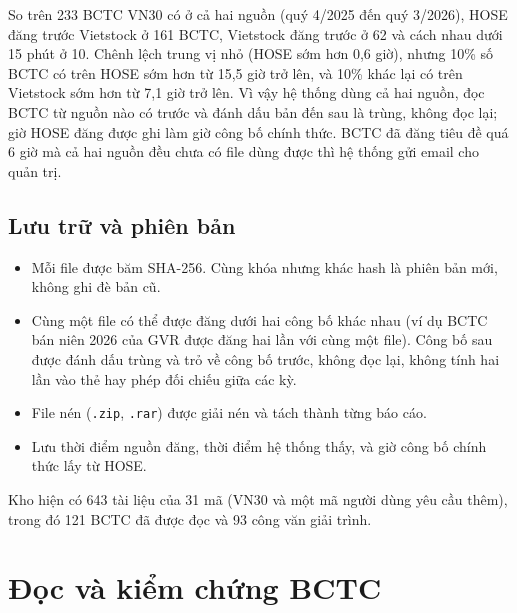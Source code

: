 \documentclass[12pt,a4paper]{report}
\newcommand{\code}[1]{\texttt{#1}}
\begin{document}
So trên 233 BCTC VN30 có ở cả hai nguồn (quý 4/2025 đến quý 3/2026), HOSE đăng trước Vietstock ở 161 BCTC, Vietstock
đăng trước ở 62 và cách nhau dưới 15 phút ở 10. Chênh lệch trung vị nhỏ (HOSE sớm hơn 0,6 giờ), nhưng 10\% số BCTC có
trên HOSE sớm hơn từ 15,5 giờ trở lên, và 10\% khác lại có trên Vietstock sớm hơn từ 7,1 giờ trở lên. Vì vậy hệ thống
dùng cả hai nguồn, đọc BCTC từ nguồn nào có trước và đánh dấu bản đến sau là trùng, không đọc lại; giờ HOSE đăng được
ghi làm giờ công bố chính thức. BCTC đã đăng tiêu đề quá 6 giờ mà cả hai nguồn đều chưa có file dùng được thì hệ thống
gửi email cho quản trị.

\subsection{Lưu trữ và phiên bản}
\begin{itemize}
  \item Mỗi file được băm SHA-256. Cùng khóa nhưng khác hash là phiên bản mới, không ghi đè bản cũ.
  \item Cùng một file có thể được đăng dưới hai công bố khác nhau (ví dụ BCTC bán niên 2026 của GVR được đăng hai lần
        với cùng một file). Công bố sau được đánh dấu trùng và trỏ về công bố trước, không đọc lại, không tính hai lần vào thẻ hay
        phép đối chiếu giữa các kỳ.
  \item File nén (\code{.zip}, \code{.rar}) được giải nén và tách thành từng báo cáo.
  \item Lưu thời điểm nguồn đăng, thời điểm hệ thống thấy, và giờ công bố chính thức lấy từ HOSE.
\end{itemize}
Kho hiện có 643 tài liệu của 31 mã (VN30 và một mã người dùng yêu cầu thêm), trong đó 121 BCTC đã được đọc và 93 công
văn giải trình.

\section{Đọc và kiểm chứng BCTC}
\end{document}
